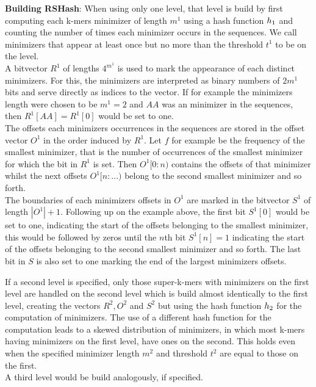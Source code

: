\documentclass[a4paper,titlepage,onecolumn,oneside,12pt,nenglish,titlepage=firstiscover]{scrbook}
\theoremstyle{plain} %
\theoremstyle{definition} %
\theoremstyle{remark} %
\theoremstyle{plain}
\newcommand{\minimizerLength}{m}
\newcommand{\threshold}{t}
\begin{document}
\textbf{Building RSHash}: When using only one level, that level is build by first computing each k-mers minimizer of length $\minimizerLength^1$ using a hash function $h_{1}$  and counting the number of times each minimizer occurs in the sequences.
We call minimizers that appear at least once but no more than the threshold $\threshold^1$ to be \infrequent on the level.\\ 
A bitvector $R^1$ of lengths $4^{\minimizerLength^1}$ is used to mark the appearance of each distinct \infrequent minimizers. For this, the minimizers are interpreted as binary numbers of $2\minimizerLength^1$ bits and serve directly as indices to the vector. If for example the minimizers length were chosen to be $\minimizerLength^1=2$ and $AA$ was an \infrequent minimizer in the sequences, then $R^1[AA] = R^1[0]$ would be set to one.\\ 
The offsets each \infrequent minimizers occurrences in the sequences are stored in the offset vector $O^1$ in the order induced by $R^1$. Let $f$ for example be the frequency of the smallest \infrequent minimizer, that is the number of occurrences of the smallest minimizer for which the bit in $R^1$ is set. Then $O^1[0:n)$ contains the offsets of that minimizer whilst the next offsets $O^1[n:...)$ belong to the second smallest minimizer and so forth.\\
The boundaries of each minimizers offsets in $O^1$ are marked in the bitvector $S^1$ of length $|O^1|+1$. Following up on the example above, the first bit $S^1[0]$ would be set to one, indicating the start of the offsets belonging to the smallest minimizer, this would be followed by zeros until the $n$th bit $S^1[n] = 1$ indicating the start of the offsets belonging to the second smallest minimizer and so forth. The last bit in $S$ is also set to one marking the end of the largest minimizers offsets.

If a second level is specified, only those super-k-mers with \frequent minimizers on the first level are handled on the second level which is build almost identically to the first level, creating the vectors $R^2, O^2$ and $S^2$ but using the hash function $h_{2}$ for the computation of minimizers. The use of a different hash function for the computation leads to a skewed distribution of minimizers, in which most k-mers having \frequent minimizers on the first level, have \infrequent ones on the second. This holds even when the specified minimizer length $\minimizerLength^2$ and threshold $\threshold^2$ are equal to those on the first.\\
A third level would be build analogously, if specified.
\end{document}
